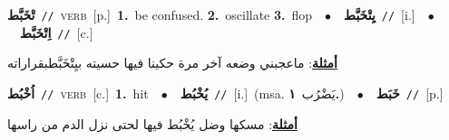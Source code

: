 \documentclass[10pt,a4paper,twoside]{article} %
\begin{document}
\begin{multicols}{2}
{{\setlength\topsep{0pt}\textbf{\foreignlanguage{arabic}{تْخَبَّط}}\ {\color{gray}\texttt{//}\color{black}}\ \textsc{verb}\ [p.]\ \textbf{1.}~be confused.  \textbf{2.}~oscillate  \textbf{3.}~flop\ \ $\bullet$\ \ \setlength\topsep{0pt}\textbf{\foreignlanguage{arabic}{يِتْخَبَّط}}\ {\color{gray}\texttt{//}\color{black}}\ [i.]\ \ $\bullet$\ \ \setlength\topsep{0pt}\textbf{\foreignlanguage{arabic}{اِتْخَبَّط}}\ {\color{gray}\texttt{//}\color{black}}\ [c.]\  \begin{flushright}\color{gray}\foreignlanguage{arabic}{\textbf{\underline{\foreignlanguage{arabic}{أمثلة}}}: ماعجبني وضعه آخر مرة حكينا فيها حسيته بيِتْخَبَّطبقراراته}\end{flushright}\color{black}} \vspace{2mm}

{\setlength\topsep{0pt}\textbf{\foreignlanguage{arabic}{اُخْبُط}}\ {\color{gray}\texttt{//}\color{black}}\ \textsc{verb}\ [c.]\ \textbf{1.}~hit\ \ $\bullet$\ \ \setlength\topsep{0pt}\textbf{\foreignlanguage{arabic}{يُخْبُط}}\ {\color{gray}\texttt{//}\color{black}}\ [i.]\ \color{gray}(msa. \foreignlanguage{arabic}{يَضْرُب}~\foreignlanguage{arabic}{\textbf{١.}})\color{black}\ \ $\bullet$\ \ \setlength\topsep{0pt}\textbf{\foreignlanguage{arabic}{خَبَط}}\ {\color{gray}\texttt{//}\color{black}}\ [p.]\  \begin{flushright}\color{gray}\foreignlanguage{arabic}{\textbf{\underline{\foreignlanguage{arabic}{أمثلة}}}: مسكها وضل يُخْبُط فيها لحتى نزل الدم من راسها}\end{flushright}\color{black}} \vspace{2mm}

}
\end{multicols}
\end{document}
